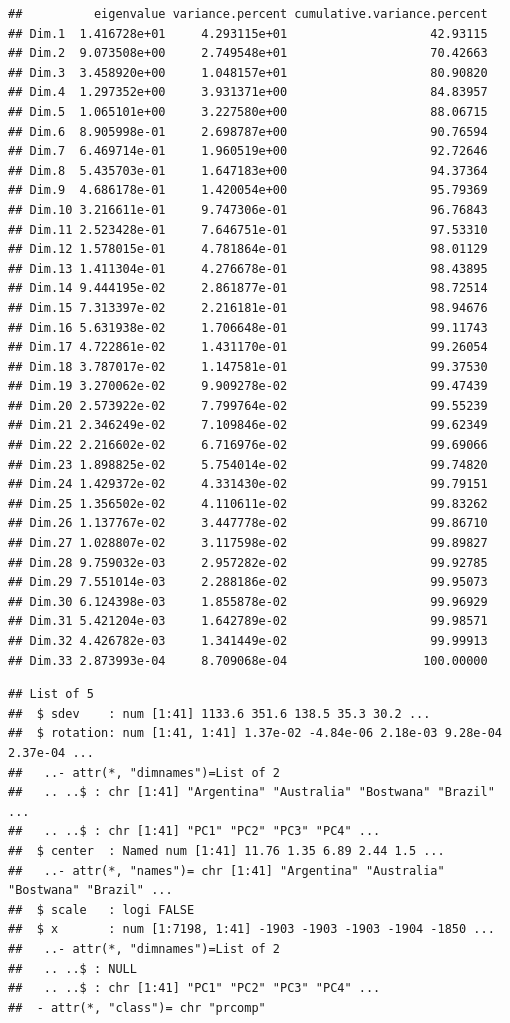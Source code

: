 \documentclass[11pt,preprint, authoryear]{elsarticle}
\numberwithin{equation}{section}
\numberwithin{figure}{section}
\numberwithin{table}{section}
\begin{document}
\begin{verbatim}
##          eigenvalue variance.percent cumulative.variance.percent
## Dim.1  1.416728e+01     4.293115e+01                    42.93115
## Dim.2  9.073508e+00     2.749548e+01                    70.42663
## Dim.3  3.458920e+00     1.048157e+01                    80.90820
## Dim.4  1.297352e+00     3.931371e+00                    84.83957
## Dim.5  1.065101e+00     3.227580e+00                    88.06715
## Dim.6  8.905998e-01     2.698787e+00                    90.76594
## Dim.7  6.469714e-01     1.960519e+00                    92.72646
## Dim.8  5.435703e-01     1.647183e+00                    94.37364
## Dim.9  4.686178e-01     1.420054e+00                    95.79369
## Dim.10 3.216611e-01     9.747306e-01                    96.76843
## Dim.11 2.523428e-01     7.646751e-01                    97.53310
## Dim.12 1.578015e-01     4.781864e-01                    98.01129
## Dim.13 1.411304e-01     4.276678e-01                    98.43895
## Dim.14 9.444195e-02     2.861877e-01                    98.72514
## Dim.15 7.313397e-02     2.216181e-01                    98.94676
## Dim.16 5.631938e-02     1.706648e-01                    99.11743
## Dim.17 4.722861e-02     1.431170e-01                    99.26054
## Dim.18 3.787017e-02     1.147581e-01                    99.37530
## Dim.19 3.270062e-02     9.909278e-02                    99.47439
## Dim.20 2.573922e-02     7.799764e-02                    99.55239
## Dim.21 2.346249e-02     7.109846e-02                    99.62349
## Dim.22 2.216602e-02     6.716976e-02                    99.69066
## Dim.23 1.898825e-02     5.754014e-02                    99.74820
## Dim.24 1.429372e-02     4.331430e-02                    99.79151
## Dim.25 1.356502e-02     4.110611e-02                    99.83262
## Dim.26 1.137767e-02     3.447778e-02                    99.86710
## Dim.27 1.028807e-02     3.117598e-02                    99.89827
## Dim.28 9.759032e-03     2.957282e-02                    99.92785
## Dim.29 7.551014e-03     2.288186e-02                    99.95073
## Dim.30 6.124398e-03     1.855878e-02                    99.96929
## Dim.31 5.421204e-03     1.642789e-02                    99.98571
## Dim.32 4.426782e-03     1.341449e-02                    99.99913
## Dim.33 2.873993e-04     8.709068e-04                   100.00000
\end{verbatim}

\begin{verbatim}
## List of 5
##  $ sdev    : num [1:41] 1133.6 351.6 138.5 35.3 30.2 ...
##  $ rotation: num [1:41, 1:41] 1.37e-02 -4.84e-06 2.18e-03 9.28e-04 2.37e-04 ...
##   ..- attr(*, "dimnames")=List of 2
##   .. ..$ : chr [1:41] "Argentina" "Australia" "Bostwana" "Brazil" ...
##   .. ..$ : chr [1:41] "PC1" "PC2" "PC3" "PC4" ...
##  $ center  : Named num [1:41] 11.76 1.35 6.89 2.44 1.5 ...
##   ..- attr(*, "names")= chr [1:41] "Argentina" "Australia" "Bostwana" "Brazil" ...
##  $ scale   : logi FALSE
##  $ x       : num [1:7198, 1:41] -1903 -1903 -1903 -1904 -1850 ...
##   ..- attr(*, "dimnames")=List of 2
##   .. ..$ : NULL
##   .. ..$ : chr [1:41] "PC1" "PC2" "PC3" "PC4" ...
##  - attr(*, "class")= chr "prcomp"
\end{verbatim}
\end{document}
